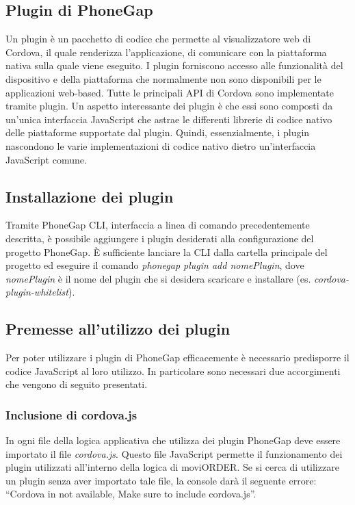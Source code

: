 \subsection{Plugin di PhoneGap}

Un plugin è un pacchetto di codice che permette al visualizzatore web di Cordova, il quale renderizza l'applicazione, di comunicare con la piattaforma nativa sulla quale viene eseguito. I plugin forniscono accesso alle funzionalità del dispositivo e della piattaforma che normalmente non sono disponibili per le applicazioni web-based. Tutte le principali API di Cordova sono implementate tramite plugin. Un aspetto interessante dei plugin è che essi sono composti da un'unica interfaccia JavaScript che astrae le differenti librerie di codice nativo delle piattaforme supportate dal plugin. Quindi, essenzialmente, i plugin nascondono le varie implementazioni di codice nativo dietro un'interfaccia JavaScript comune.

\subsection{Installazione dei plugin}

Tramite PhoneGap CLI, interfaccia a linea di comando precedentemente descritta, è possibile aggiungere i plugin desiderati alla configurazione del progetto PhoneGap. È sufficiente lanciare la CLI dalla cartella principale del progetto ed eseguire il comando \textit{phonegap plugin add nomePlugin}, dove \textit{nomePlugin} è il nome del plugin che si desidera scaricare e installare (es. \textit{cordova-plugin-whitelist}).

\subsection{Premesse all'utilizzo dei plugin}

Per poter utilizzare i plugin di PhoneGap efficacemente è necessario predisporre il codice JavaScript al loro utilizzo. In particolare sono necessari due accorgimenti che vengono di seguito presentati.

\subsubsection{Inclusione di cordova.js}

In ogni file della logica applicativa che utilizza dei plugin PhoneGap deve essere importato il file \textit{cordova.js}. Questo file JavaScript permette il funzionamento dei plugin utilizzati all'interno della logica di moviORDER. Se si cerca di utilizzare un plugin senza aver importato tale file, la console darà il seguente errore: ``Cordova in not available, Make sure to include cordova.js''.

